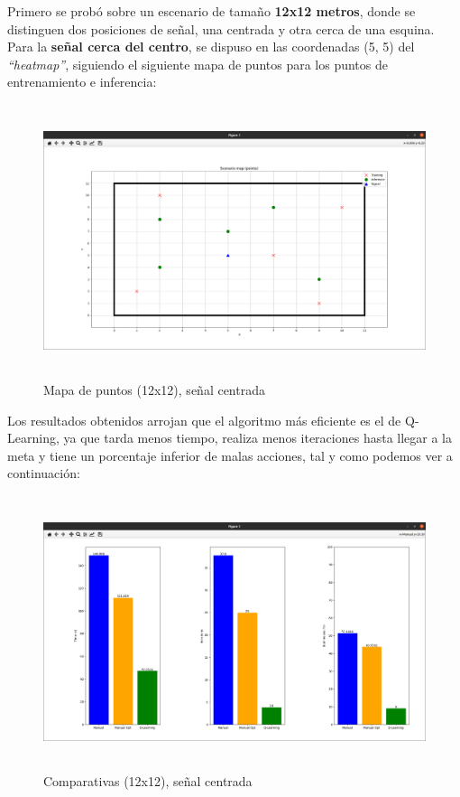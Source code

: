 Primero se probó sobre un escenario de tamaño \textbf{12x12 metros}, donde se distinguen dos posiciones de señal, una centrada y otra cerca de una esquina.\\
\newpage
Para la \textbf{señal cerca del centro}, se dispuso en las coordenadas (5, 5) del \emph{``heatmap''}, siguiendo el siguiente mapa de puntos para los puntos de entrenamiento e inferencia:\\

\begin{figure} [H]
    \begin{center}
    \includegraphics[height=8cm]{imagenes/cap4/17_mapa_p_centro_12.png}
    \end{center}
    \caption[Mapa de puntos (12x12), señal centrada]{Mapa de puntos (12x12), señal centrada}
    \label{fig:map_p_center_12}
\end{figure}

Los resultados obtenidos arrojan que el algoritmo más eficiente es el de Q-Learning, ya que tarda menos tiempo, realiza menos iteraciones hasta llegar a la meta y tiene un porcentaje inferior de malas acciones, tal y como podemos ver a continuación:\\

\begin{figure} [H]
    \begin{center}
    \includegraphics[height=8cm]{imagenes/cap4/18_comp_centro_12.png}
    \end{center}
    \caption[Comparativas (12x12), señal centrada]{Comparativas (12x12), señal centrada}
    \label{fig:comp_center_12}
\end{figure}

